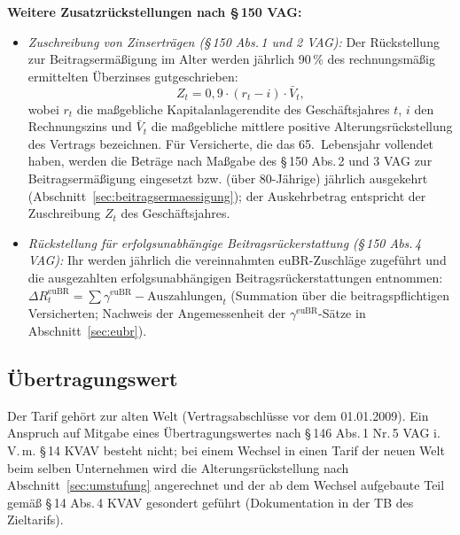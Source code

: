 \textbf{Weitere Zusatzrückstellungen nach \S\,150 VAG:}
\begin{itemize}\itemsep2pt
  \item \emph{Zuschreibung von Zinserträgen (\S\,150 Abs.\,1 und 2
        VAG):} Der Rückstellung zur Beitragsermäßigung im Alter werden
        jährlich 90\,\% des rechnungsmäßig ermittelten Überzinses
        gutgeschrieben:
        \begin{equation}
        Z_t = 0{,}9\cdot(r_t - i)\cdot \bar{V}_t,
        \label{eq:ueberzins}
        \end{equation}
        wobei $r_t$ die maßgebliche Kapitalanlagerendite des
        Geschäftsjahres $t$, $i$ den Rechnungszins und $\bar{V}_t$ die
        maßgebliche mittlere positive Alterungsrückstellung des
        Vertrags bezeichnen. Für Versicherte, die das 65.~Lebensjahr
        vollendet haben, werden die Beträge nach Maßgabe des \S\,150
        Abs.\,2 und 3 VAG zur Beitragsermäßigung eingesetzt bzw.
        (über 80-Jährige) jährlich ausgekehrt
        (Abschnitt~\ref{sec:beitragsermaessigung}); der Auskehrbetrag
        entspricht der Zuschreibung $Z_t$ des Geschäftsjahres.
  \item \emph{Rückstellung für erfolgsunabhängige Beitragsrückerstattung
        (\S\,150 Abs.\,4 VAG):} Ihr werden jährlich die vereinnahmten
        euBR-Zuschläge zugeführt und die ausgezahlten
        erfolgsunabhängigen Beitragsrückerstattungen entnommen:
        $\Delta R^{\mathrm{euBR}}_t = \sum \gamma^{\mathrm{euBR}}
        - \text{Auszahlungen}_t$ (Summation über die beitragspflichtigen
        Versicherten; Nachweis der Angemessenheit der
        $\gamma^{\mathrm{euBR}}$-Sätze in
        Abschnitt~\ref{sec:eubr}).
\end{itemize}

\subsection{Übertragungswert}\label{sec:uew}

Der Tarif gehört zur alten Welt (Vertragsabschlüsse vor dem
01.01.2009). Ein Anspruch auf Mitgabe eines Übertragungswertes nach
\S\,146 Abs.\,1 Nr.\,5 VAG i.\,V.\,m. \S\,14 KVAV besteht nicht;
bei einem Wechsel in einen Tarif der neuen Welt beim selben
Unternehmen wird die Alterungsrückstellung nach
Abschnitt~\ref{sec:umstufung} angerechnet und der ab dem Wechsel
aufgebaute Teil gemäß \S\,14 Abs.\,4 KVAV gesondert geführt
(Dokumentation in der TB des Zieltarifs).
